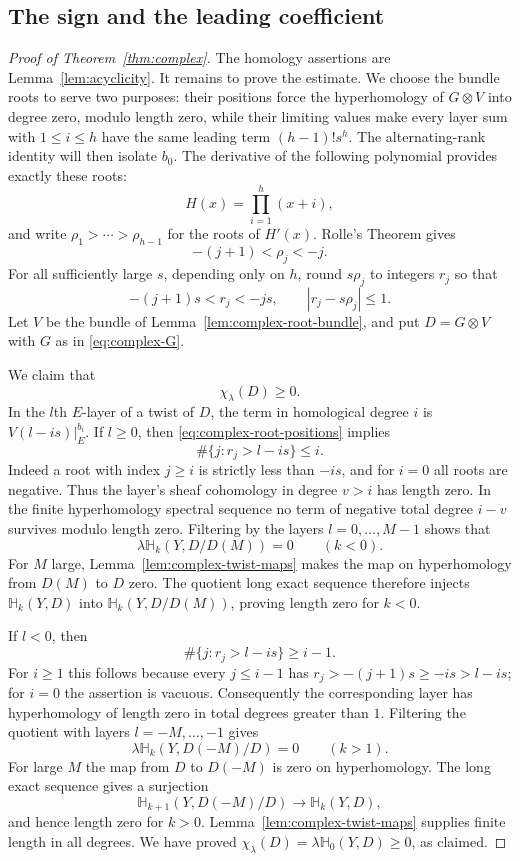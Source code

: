\subsection{The sign and the leading coefficient}

\begin{proof}[Proof of Theorem~\ref{thm:complex}]
The homology assertions are Lemma~\ref{lem:acyclicity}. It remains to
prove the estimate. We choose the bundle roots to serve two purposes:
their positions force the hyperhomology of $G\otimes V$ into degree zero,
modulo length zero, while their limiting values make every layer sum
with $1\leq i\leq h$ have the same leading term $(h-1)!s^h$.
The alternating-rank identity will then isolate $b_0$.
The derivative of the following polynomial provides exactly these roots:
\[
 H(x)=\prod_{i=1}^h(x+i),
\]
and write $\rho_1>\cdots>\rho_{h-1}$ for the roots of $H'(x)$.
Rolle's Theorem gives
\[
 -(j+1)<\rho_j<-j.
\]
For all sufficiently large $s$, depending only on $h$, round $s\rho_j$
to integers $r_j$ so that
\begin{equation}\label{eq:complex-root-positions}
 -(j+1)s<r_j<-js,\qquad |r_j-s\rho_j|\leq1.
\end{equation}
Let $V$ be the bundle of Lemma~\ref{lem:complex-root-bundle}, and put
$D=G\otimes V$ with $G$ as in \eqref{eq:complex-G}.

We claim that
\begin{equation}\label{eq:complex-positive-chi}
 \chi_\lambda(D)\geq0.
\end{equation}
In the $l$th $E$-layer of a twist of $D$, the term in homological degree
$i$ is $V(l-is)|_E^{b_i}$. If $l\geq0$, then
\eqref{eq:complex-root-positions} implies
\[
 \#\{j:r_j>l-is\}\leq i.
\]
Indeed a root with index $j\geq i$ is strictly less than $-is$, and
for $i=0$ all roots are negative. Thus the layer's sheaf cohomology in
degree $v>i$ has length zero. In the finite hyperhomology spectral
sequence no term of negative total degree $i-v$ survives modulo length
zero. Filtering by the layers $l=0,\ldots,M-1$ shows that
\[
 \lambda\mathbb H_k(Y,D/D(M))=0\qquad(k<0).
\]
For $M$ large, Lemma~\ref{lem:complex-twist-maps} makes the map on
hyperhomology from $D(M)$ to $D$ zero. The quotient long exact sequence
therefore injects $\mathbb H_k(Y,D)$ into
$\mathbb H_k(Y,D/D(M))$, proving length zero for $k<0$.

If $l<0$, then
\[
 \#\{j:r_j>l-is\}\geq i-1.
\]
For $i\geq1$ this follows because every $j\leq i-1$ has
$r_j>-(j+1)s\geq-is>l-is$; for $i=0$ the assertion is vacuous.
Consequently the corresponding layer has hyperhomology of length zero
in total degrees greater than $1$. Filtering the quotient with layers
$l=-M,\ldots,-1$ gives
\[
 \lambda\mathbb H_k(Y,D(-M)/D)=0\qquad(k>1).
\]
For large $M$ the map from $D$ to $D(-M)$ is zero on hyperhomology.
The long exact sequence gives a surjection
\[
 \mathbb H_{k+1}(Y,D(-M)/D)\longrightarrow\mathbb H_k(Y,D),
\]
and hence length zero for $k>0$. Lemma~\ref{lem:complex-twist-maps}
supplies finite length in all degrees. We have proved
$\chi_\lambda(D)=\lambda\mathbb H_0(Y,D)\geq0$, as claimed.


\end{proof}
